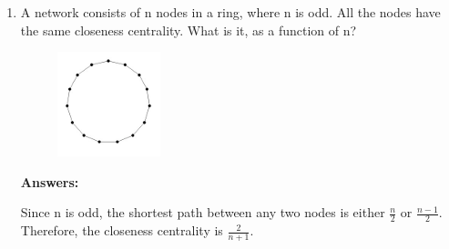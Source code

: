 \documentclass{amsart}
\theoremstyle{definition}
\theoremstyle{remark}
\numberwithin{equation}{section}
\begin{document}
\begin{enumerate}
\begin{enumerate}
The python code output: \vspace{0.2cm}

{0: 0.6666666666666666, 1: 0.6666666666666666, 2: 0.6666666666666666, 3: 0.6666666666666666}


\vspace{0.2cm}
\end{enumerate}
\clearpage

\item A network consists of n nodes in a ring, where n is odd. All the nodes have the same closeness centrality. What is it, as a function of n? \vspace{0.2cm}


\begin{figure}[h]
\includegraphics[width=0.2\linewidth]{images/hw3_figure1.PNG}
\end{figure}

\vspace{0.2cm}

\textbf{Answers:}

\vspace{0.2cm}

Since n is odd, the shortest path between any two nodes is either $\frac{n}{2}$ or $\frac{n-1}{2}$. Therefore, the closeness centrality is $\frac{2}{n+1}$.

\vspace{0.2cm}


\end{enumerate}
\end{document}
